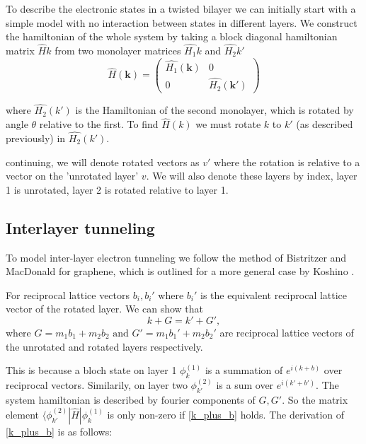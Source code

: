 \documentclass[10pt, twocolumn]{article} %
\begin{document}
  To describe the electronic states in a twisted bilayer we can initially start with a simple model with no interaction between states in different layers. We construct the hamiltonian of the whole system by taking a block diagonal hamiltonian matrix $\hat{H}{k}$ from two monolayer matrices $\hat{H_1}{k}$ and $\hat{H_2}{k'}$
%
      \begin{equation}
        \hat{H}(\boldsymbol{k})=\left(\begin{array}{cc}
          \hat{H_1}(\boldsymbol{k}) & 0\\
          0 & \hat{H_2}(\boldsymbol{k'})
        \end{array}\right)
      \end{equation}
      
  where $\hat{H_2}(k')$ is the Hamiltonian of the second monolayer, which is rotated by angle $\theta$ relative to the first. To find $\hat{H}(k)$ we must rotate $k$ to $k'$ (as described previously) in $\hat{H_2}(k')$.

  continuing, we will denote rotated vectors as $v'$ where the rotation is relative to a vector on the 'unrotated layer' $v$. We will also denote these layers by index, layer 1 is unrotated, layer 2 is rotated relative to layer 1.

\subsection*{Interlayer tunneling}
  To model inter-layer electron tunneling we follow the method of Bistritzer and MacDonald \cite{Bistritzer2011} for graphene, which is outlined for a more general case by Koshino \cite{Koshino2015}.

  For reciprocal lattice vectors $b_i, b_i'$ where $b_i'$ is the equivalent reciprocal lattice vector of the rotated layer. We can show that
  \begin{equation}
    k + G = k' + G',
    \label{inter-layer_k_plus_G}
  \end{equation}
  where $G = m_1 b_1 + m_2 b_2 \text{ and } G' = m_1 b_1' + m_2 b_2'$ are reciprocal lattice vectors of the unrotated and rotated layers respectively.

  This is because a bloch state on layer 1 $\phi_k^{(1)}$ is a summation of $e^{i(k+b)}$ over reciprocal vectors. Similarily, on layer two $\phi_{k'}^{(2)}$ is a sum over $e^{i(k'+b')}$. The system hamiltonian is described by fourier components of $G, G'$. So the matrix element $\langle \phi_{k'}^{(2)} | \hat{H} | \phi_{k}^{(1)}$ is only non-zero if \ref{k_plus_b} holds. The derivation of \ref{k_plus_b} is as follows:
\end{document}
